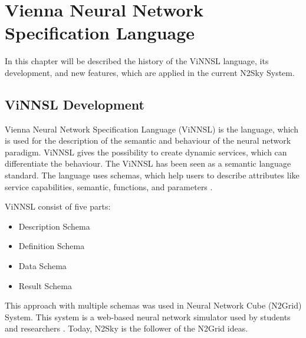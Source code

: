 \section{Vienna Neural Network Specification Language}\label{ViNNSL 2.0 extended}

In this chapter will be described the history of the ViNNSL language, its development, and new features, which are applied in the current N2Sky System.

\subsection{ViNNSL Development}\label{ViNNSL Development}
Vienna Neural Network Specification Language (ViNNSL) is the language, which is used for the description of the semantic and behaviour of the neural network paradigm. ViNNSL gives the possibility to create dynamic services, which can differentiate the behaviour. The ViNNSL has been seen as a semantic language standard. The language uses schemas, which help users to describe attributes like service capabilities, semantic, functions, and parameters \cite{Beran2008}.

ViNNSL consist of five parts:
\begin{itemize}
\item Description Schema
\item Definition Schema
\item Data Schema
\item Result Schema
\end{itemize}

This approach with multiple schemas was used in Neural Network Cube (N2Grid) System. This system is a web-based neural network simulator used by students and researchers \cite{schikuta2004n2grid}. Today, N2Sky is the follower of the N2Grid ideas. 


